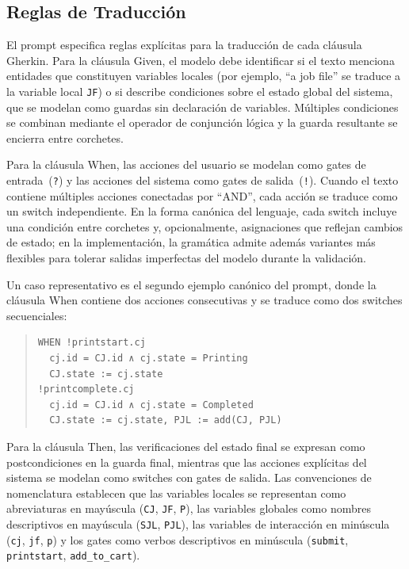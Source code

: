 \subsection{Reglas de Traducción}

El prompt especifica reglas explícitas para la traducción de cada cláusula Gherkin. Para la cláusula Given, el modelo debe identificar si el texto menciona entidades que constituyen variables locales (por ejemplo, ``a job file'' se traduce a la variable local \texttt{JF}) o si describe condiciones sobre el estado global del sistema, que se modelan como guardas sin declaración de variables. Múltiples condiciones se combinan mediante el operador de conjunción lógica y la guarda resultante se encierra entre corchetes.

Para la cláusula When, las acciones del usuario se modelan como gates de entrada~(\texttt{?}) y las acciones del sistema como gates de salida~(\texttt{!}). Cuando el texto contiene múltiples acciones conectadas por ``AND'', cada acción se traduce como un switch independiente. En la forma canónica del lenguaje, cada switch incluye una condición entre corchetes y, opcionalmente, asignaciones que reflejan cambios de estado; en la implementación, la gramática admite además variantes más flexibles para tolerar salidas imperfectas del modelo durante la validación.

Un caso representativo es el segundo ejemplo canónico del prompt, donde la cláusula When contiene dos acciones consecutivas y se traduce como dos switches secuenciales:

\begin{quote}
\begin{Verbatim}[fontsize=\small]
WHEN !printstart.cj
  cj.id = CJ.id ∧ cj.state = Printing
  CJ.state := cj.state
!printcomplete.cj
  cj.id = CJ.id ∧ cj.state = Completed
  CJ.state := cj.state, PJL := add(CJ, PJL)
\end{Verbatim}
\end{quote}

Para la cláusula Then, las verificaciones del estado final se expresan como postcondiciones en la guarda final, mientras que las acciones explícitas del sistema se modelan como switches con gates de salida. Las convenciones de nomenclatura establecen que las variables locales se representan como abreviaturas en mayúscula (\texttt{CJ}, \texttt{JF}, \texttt{P}), las variables globales como nombres descriptivos en mayúscula (\texttt{SJL}, \texttt{PJL}), las variables de interacción en minúscula (\texttt{cj}, \texttt{jf}, \texttt{p}) y los gates como verbos descriptivos en minúscula (\texttt{submit}, \texttt{printstart}, \texttt{add\_to\_cart}).

